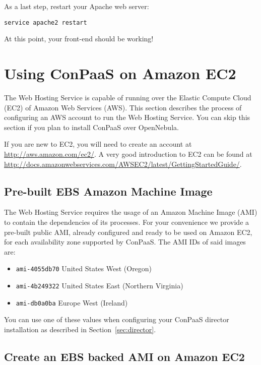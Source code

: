 \documentclass[10pt]{article}
\begin{document}
As a last step, restart your Apache web server:

\begin{verbatim}
service apache2 restart
\end{verbatim}

At this point, your front-end should be working!

\section{Using ConPaaS on Amazon EC2}
\label{sec:ec2image}

The Web Hosting Service is capable of running over the Elastic Compute
Cloud (EC2) of Amazon Web Services (AWS). This section describes the
process of configuring an AWS account to run the Web Hosting Service.
You can skip this section if you plan to install ConPaaS over
OpenNebula.

If you are new to EC2, you will need to create an account at
\url{http://aws.amazon.com/ec2/}. A very good introduction to EC2 can be found
at \url{http://docs.amazonwebservices.com/AWSEC2/latest/GettingStartedGuide/}.

\subsection{Pre-built EBS Amazon Machine Image}

The Web Hosting Service requires the usage of an Amazon Machine Image (AMI) to
contain the dependencies of its processes. For your convenience we provide a
pre-built public AMI, already configured and ready to be used on Amazon EC2,
for each availability zone supported by ConPaaS. The AMI IDs of said images
are:

\begin{itemize}
    \item \verb+ami-4055db70+ United States West (Oregon)
    \item \verb+ami-4b249322+ United States East (Northern Virginia)
    \item \verb+ami-db0a0ba+ Europe West (Ireland)
\end{itemize}

You can use one of these values when configuring your ConPaaS director
installation as described in Section~\ref{sec:director}.

\subsection{Create an EBS backed AMI on Amazon EC2}
\end{document}
